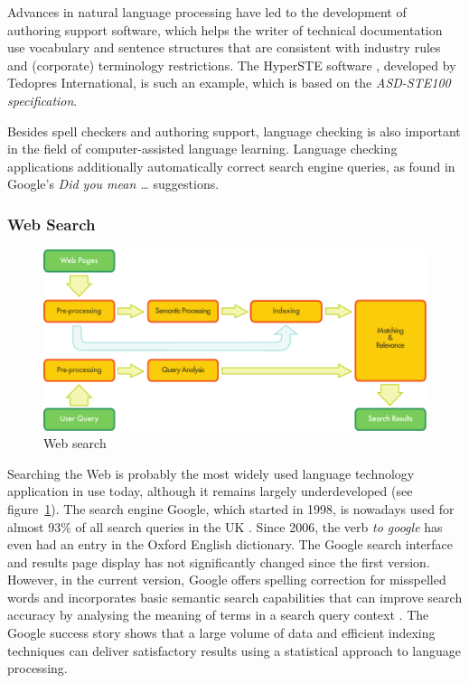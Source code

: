 \begin{multicols}{2}
Advances in natural language processing have led to the development of authoring support software, which helps the writer of technical documentation use vocabulary and sentence structures that are consistent with industry rules and (corporate) terminology restrictions. The HyperSTE software \cite{hss}, developed by Tedopres International, is such an example, which is based on the \textit{ASD-STE100 specification}.


Besides spell checkers and authoring support, language checking is also important in the field of computer-assisted language learning. Language checking applications additionally automatically correct search engine queries, as found in Google’s \textit{Did you mean \dots} suggestions.

\subsubsection{Web Search}

\begin{figure}[htb]
  \center
  \includegraphics[width=\textwidth]{../_media/english/web_search_architecture}
  \caption{Web search}
  \label{fig:websearcharch_en}
\end{figure}

Searching the Web is probably the most widely used language technology application in use today, although it remains largely underdeveloped (see figure~\ref{fig:websearcharch_en}). The search engine Google, which started in 1998, is nowadays used for almost 93\% of all search queries in the UK  \cite{stats4}. Since 2006, the verb \textit{to google} has even had an entry in the Oxford English dictionary. The Google search interface and results page display has not significantly changed since the first version. However, in the current version, Google offers spelling correction for misspelled words and incorporates basic semantic search capabilities that can improve search accuracy by analysing the meaning of terms in a search query context \cite{pc1}. The Google success story shows that a large volume of data and efficient indexing techniques can deliver satisfactory results using a statistical approach to language processing.


\end{multicols}
